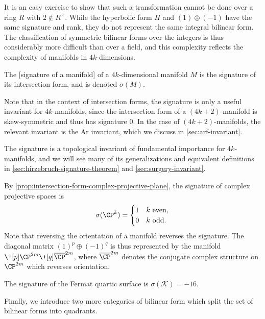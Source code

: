 It is an easy exercise to show that such a transformation cannot be done over a ring $R$ with $2\not\in R^\times$. While the hyperbolic form $H$ and $(1)\oplus (-1)$ have the same signature and rank, they do not represent the same integral bilinear form. 
The classification of symmetric bilinear forms over the integers is thus considerably more difficult than over a field, and this complexity reflects the complexity of manifolds in $4k$-dimensions.

\begin{definition}
	The [signature of a manifold] of a $4k$-dimensional manifold $M$ is the signature of its intersection form, and is denoted $\sigma(M)$.
\end{definition}

\begin{remark}
	Note that in the context of intersection forms, the signature is only a useful invariant for $4k$-manifolds, since the intersection form of a $(4k+2)$-manifold is skew-symmetric and thus has signature $0$. In the case of $(4k+2)$-manifolds, the relevant invariant is the Ar invariant, which we discuss in \cref{sec:arf-invariant}.
\end{remark}

The signature is a topological invariant of fundamental importance for $4k$-manifolds, and we will see many of its generalizations and equivalent definitions in \cref{sec:hirzebruch-signature-theorem} and \cref{sec:surgery-invariant}.

\begin{example}
	By \cref{prop:intersection-form-complex-projective-plane}, the signature of complex projective spaces is
	\[
		\sigma(\CP^k)=\begin{cases}1 & k\textrm{ even},\\ 0 & k\textrm{ odd}.\end{cases}
	\]
Note that reversing the orientation of a manifold reverses the signature. The diagonal matrix $(1)^p\oplus (-1)^q$ is thus represented by the manifold $\+[p] \CP^{2m} \+[q] \overline{\CP}^{2m}$, where $\overline{\CP}^{2m}$ denotes the conjugate complex structure on $\CP^{2m}$ which reverses orientation.
\end{example}

\begin{example}
		The signature of the Fermat quartic surface is $\sigma(\mathcal{K})=-16$.
\end{example}

Finally, we introduce two more categories of bilinear form which split the set of bilinear forms into quadrants.


